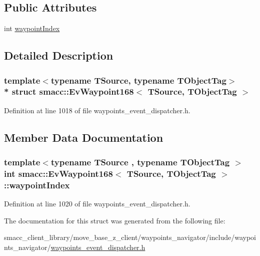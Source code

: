 \subsection*{Public Attributes}
\begin{DoxyCompactItemize}
\item 
int \hyperlink{structsmacc_1_1EvWaypoint168_a76d550c3fd0776dae556715ffd40a2b1}{waypoint\+Index}
\end{DoxyCompactItemize}


\subsection{Detailed Description}
\subsubsection*{template$<$typename T\+Source, typename T\+Object\+Tag$>$\\*
struct smacc\+::\+Ev\+Waypoint168$<$ T\+Source, T\+Object\+Tag $>$}



Definition at line 1018 of file waypoints\+\_\+event\+\_\+dispatcher.\+h.



\subsection{Member Data Documentation}
\subsubsection[{\texorpdfstring{waypoint\+Index}{waypointIndex}}]{\setlength{\rightskip}{0pt plus 5cm}template$<$typename T\+Source , typename T\+Object\+Tag $>$ int {\bf smacc\+::\+Ev\+Waypoint168}$<$ T\+Source, T\+Object\+Tag $>$\+::waypoint\+Index}\hypertarget{structsmacc_1_1EvWaypoint168_a76d550c3fd0776dae556715ffd40a2b1}{}\label{structsmacc_1_1EvWaypoint168_a76d550c3fd0776dae556715ffd40a2b1}


Definition at line 1020 of file waypoints\+\_\+event\+\_\+dispatcher.\+h.



The documentation for this struct was generated from the following file\+:\begin{DoxyCompactItemize}
\item 
smacc\+\_\+client\+\_\+library/move\+\_\+base\+\_\+z\+\_\+client/waypoints\+\_\+navigator/include/waypoints\+\_\+navigator/\hyperlink{waypoints__event__dispatcher_8h}{waypoints\+\_\+event\+\_\+dispatcher.\+h}\end{DoxyCompactItemize}
